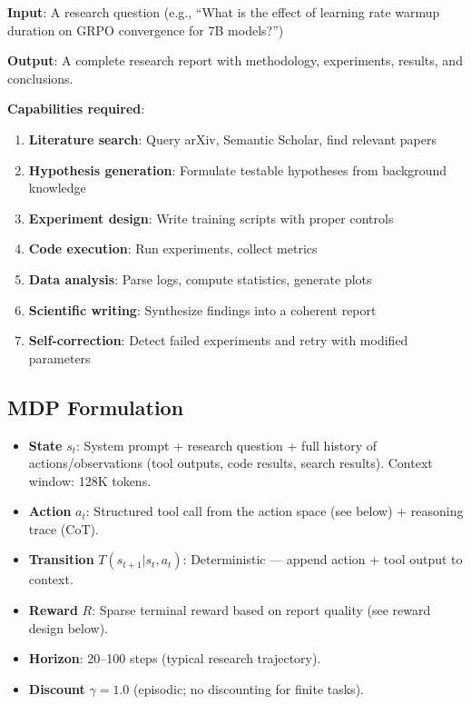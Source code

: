 \begin{keybox}
\textbf{Input}: A research question (e.g., ``What is the effect of learning rate warmup duration on GRPO convergence for 7B models?'')

\textbf{Output}: A complete research report with methodology, experiments, results, and conclusions.

\textbf{Capabilities required}:

\begin{enumerate}
  \item \textbf{Literature search}: Query arXiv, Semantic Scholar, find relevant papers
  \item \textbf{Hypothesis generation}: Formulate testable hypotheses from background knowledge
  \item \textbf{Experiment design}: Write training scripts with proper controls
  \item \textbf{Code execution}: Run experiments, collect metrics
  \item \textbf{Data analysis}: Parse logs, compute statistics, generate plots
  \item \textbf{Scientific writing}: Synthesize findings into a coherent report
  \item \textbf{Self-correction}: Detect failed experiments and retry with modified parameters
\end{enumerate}
\end{keybox}

\subsection{MDP Formulation}
\label{mdp-formulation}

\begin{keybox}
\begin{itemize}
  \item \textbf{State} $s_t$: System prompt + research question + full history of actions/observations (tool outputs, code results, search results). Context window: 128K tokens.
  \item \textbf{Action} $a_t$: Structured tool call from the action space (see below) + reasoning trace (CoT).
  \item \textbf{Transition} $T(s_{t+1}|s_t, a_t)$: Deterministic --- append action + tool output to context.
  \item \textbf{Reward} $R$: Sparse terminal reward based on report quality (see reward design below).
  \item \textbf{Horizon}: 20--100 steps (typical research trajectory).
  \item \textbf{Discount} $\gamma = 1.0$ (episodic; no discounting for finite tasks).
\end{itemize}
\end{keybox}

